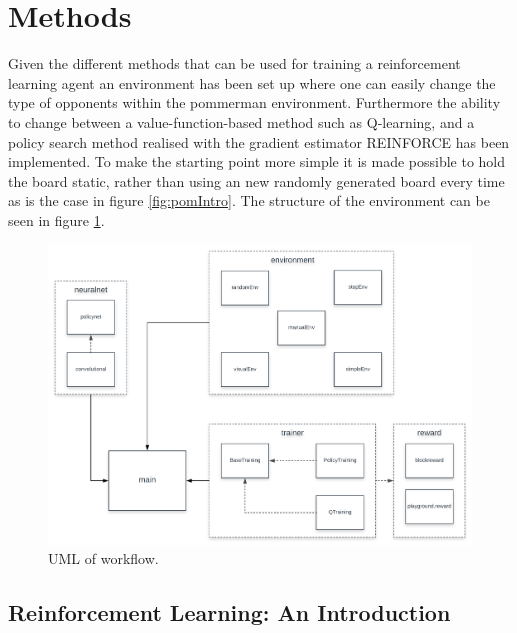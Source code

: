 \section{Methods}
Given the different methods that can be used for training a reinforcement learning agent an environment has been set up where one can easily change the type of opponents within the pommerman environment. Furthermore the ability to change between a value-function-based method such as Q-learning, and a policy search method realised with the gradient estimator REINFORCE has been implemented.\cite{sutton1998a} To make the starting point more simple it is made possible to hold the board static, rather than using an new randomly generated board every time as is the case in figure \ref{fig:pomIntro}. The structure of the environment can be seen in figure \ref{fig:uml}.

\begin{figure}[htb]
    \centerline{\includegraphics[width=0.8\linewidth]{docs/article/inputs/02456-UML.pdf}}
    \caption{UML of workflow.}\label{fig:uml}
\end{figure}




\subsection{Reinforcement Learning: An Introduction} %


